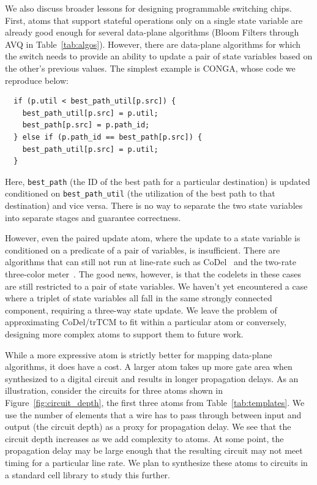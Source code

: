 We also discuss broader lessons for designing programmable switching chips.
First, atoms that support stateful operations only on a single state variable
are already good enough for several data-plane algorithms (Bloom Filters
through AVQ in Table~\ref{tab:algos}). However, there are data-plane algorithms
for which the switch needs to provide an ability to update a pair of state
variables based on the other's previous values. The simplest example
is CONGA, whose code we reproduce below:
\begin{verbatim}
  if (p.util < best_path_util[p.src]) {
    best_path_util[p.src] = p.util;
    best_path[p.src] = p.path_id;
  } else if (p.path_id == best_path[p.src]) {
    best_path_util[p.src] = p.util;
  }
\end{verbatim}
Here, \texttt{best\_path} (the ID of the best path for a particular
destination) is updated conditioned on \texttt{best\_path\_util} (the utilization of
the best path to that destination) and vice versa. There is no way to separate
the two state variables into separate stages and guarantee correctness.

However, even the paired update atom, where the update to a state variable is
conditioned on a predicate of a pair of variables, is insufficient.  There are
algorithms that can still not run at line-rate such as CoDel~\cite{codel} and
the two-rate three-color meter~\cite{trTCM}. The good news, however, is that
the codelets in these cases are still restricted to a pair of state variables.
We haven't yet encountered a case where a triplet of state variables all fall
in the same strongly connected component, requiring a three-way state update.
We leave the problem of approximating CoDel/trTCM to fit within a particular
atom or conversely, designing more complex atoms to support them to future work.

While a more expressive atom is strictly better for mapping data-plane
algorithms, it does have a cost. A larger atom takes up more gate area when
synthesized to a digital circuit and results in longer propagation delays. As
an illustration, consider the circuits for three atoms shown in
Figure~\ref{fig:circuit_depth}, the first three atoms from
Table~\ref{tab:templates}. We use the number of elements that a wire has to
pass through between input and output (the circuit depth) as a proxy for
propagation delay. We see that the circuit depth increases as we add
complexity to atoms. At some point, the propagation delay may be large enough
that the resulting circuit may not meet timing for a particular line rate. We
plan to synthesize these atoms to circuits in a standard cell library to study
this further.

